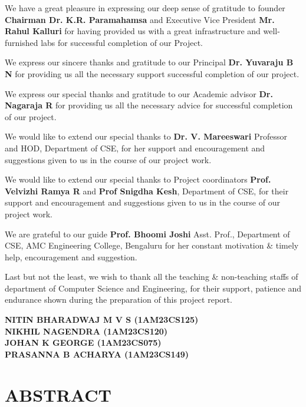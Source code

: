 \documentclass[a4paper, 12pt]{report}
\begin{document}
We have a great pleasure in expressing our deep sense of gratitude to founder \textbf{Chairman Dr. K.R. Paramahamsa} and Executive Vice President \textbf{Mr. Rahul Kalluri} for having provided us with a great infrastructure and well-furnished labs for successful completion of our Project.

We express our sincere thanks and gratitude to our Principal \textbf{Dr. Yuvaraju B N} for providing us all the necessary support successful completion of our project.

We express our special thanks and gratitude to our Academic advisor \textbf{Dr. Nagaraja R} for providing us all the necessary advice for successful completion of our project.

We would like to extend our special thanks to \textbf{Dr. V. Mareeswari} Professor and HOD, Department of CSE, for her support and encouragement and suggestions given to us in the course of our project work.

We would like to extend our special thanks to Project coordinators \textbf{Prof. Velvizhi Ramya R} and \textbf{Prof Snigdha Kesh}, Department of CSE, for their support and encouragement and suggestions given to us in the course of our project work.

We are grateful to our guide \textbf{Prof. Bhoomi Joshi} Asst. Prof., Department of CSE, AMC Engineering College, Bengaluru for her constant motivation \& timely help, encouragement and suggestion.

Last but not the least, we wish to thank all the teaching \& non-teaching staffs of department of Computer Science and Engineering, for their support, patience and endurance shown during the preparation of this project report.\\

\vspace{1cm}

{\raggedleft 
\textbf{NITIN BHARADWAJ M V S (1AM23CS125)}\\
\textbf{NIKHIL NAGENDRA (1AM23CS120)}\\
\textbf{JOHAN K GEORGE (1AM23CS075)}\\
\textbf{PRASANNA B ACHARYA (1AM23CS149)} 
\par}


\pagebreak

\chapter*{ABSTRACT}
\thispagestyle{borderedpage}
\end{document}
